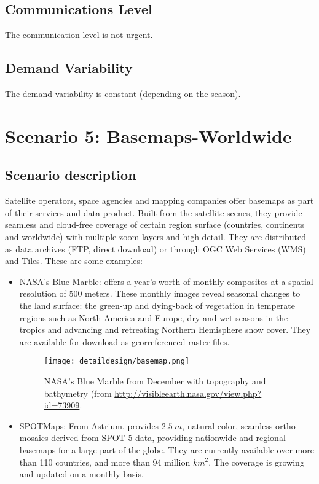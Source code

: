 \subsection{Communications Level}
The communication level is not urgent.
\subsection{Demand Variability}
The demand variability is constant (depending on the season).

\section{Scenario 5: Basemaps-Worldwide}
\subsection{Scenario description}
Satellite operators, space agencies and mapping companies offer basemaps as part of their services and data product. Built from the satellite scenes, they provide seamless and cloud-free coverage of certain region surface (countries, continents and worldwide) with multiple zoom layers and high detail. They are distributed as data archives (\ac{FTP}, direct download) or through OGC Web Services (\ac{WMS}) and Tiles. These are some examples:
\begin{itemize}
\item NASA's Blue Marble: offers a year's worth of monthly composites at a spatial resolution of 500 meters. These monthly images reveal seasonal changes to the land surface: the green-up and dying-back of vegetation in temperate regions such as North America and Europe, dry and wet seasons in the tropics and advancing and retreating Northern Hemisphere snow cover. They are available for download as georreferenced raster files. 

\begin{figure}[!h]
\begin{center}
\texttt{[image: detaildesign/basemap.png]}
\caption{NASA's Blue Marble from December with topography and bathymetry (from \url{http://visibleearth.nasa.gov/view.php?id=73909}.}
\label{fig:basemap}
\end{center}
\end{figure}
\item SPOTMaps: From Astrium, provides $2.5~m$, natural color, seamless
  ortho-mosaics derived from SPOT 5 data, providing nationwide and regional
  basemaps for a large part of the globe. They are currently available over more
  than 110 countries, and more than 94 million $km^2$. The coverage is growing
  and updated on a monthly basis.
\end{itemize}

